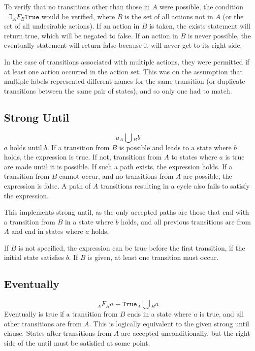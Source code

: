 \documentclass[a4paper,11pt]{article}
\begin{document}
	To verify that no transitions other than those in $A$ were possible, the condition $\neg \exists _A F{_B}\texttt{True}$ would be verified, where $B$ is the set of all actions not in $A$ (or the set of all undesirable actions). If an action in $B$ is taken, the exists statement will return true, which will be negated to false. If an action in $B$ is never possible, the eventually statement will return false because it will never get to its right side.
	
	In the case of transitions associated with multiple actions, they were permitted if at least one action occurred in the action set. This was on the assumption that multiple labels represented different names for the same transition (or duplicate transitions between the same pair of states), and so only one had to match.
	
	\subsection{Strong Until}
	$$a _A\bigcup{_B b} $$
	$a$ holds until $b$. If a transition from $B$ is possible and leads to a state where $b$ holds, the expression is true. If not, transitions from $A$ to states where $a$ is true are made until it is possible. If such a path exists, the expression holds. If a transition from $B$ cannot occur, and no transitions from $A$ are possible, the expression is false. A path of $A$ transitions resulting in a cycle also fails to satisfy the expression.
	
	This implements strong until, as the only accepted paths are those that end with a transition from $B$ in a state where $b$ holds, and all previous transitions are from $A$ and end in states where $a$ holds.
	
	If $B$ is not specified, the expression can be true before the first transition, if the initial state satisfies $b$. If $B$ is given, at least one transition must occur.
	
	\subsection{Eventually}
	$$_A F{_Ba} \equiv \texttt{True} _A\bigcup{_B a} $$
	Eventually is true if a transition from $B$ ends in a state where $a$ is true, and all other transitions are from $A$. This is logically equivalent to the given strong until clause. States after transitions from $A$ are accepted unconditionally, but the right side of the until must be satisfied at some point.
	
\end{document}
